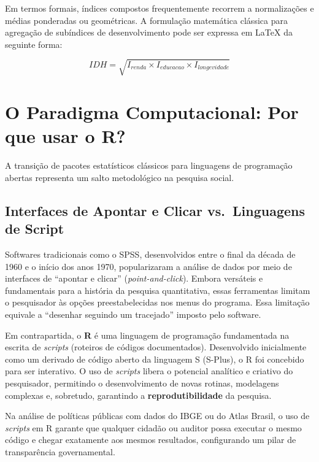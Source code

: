 \documentclass[
  brazilian,
  11pt,
  a4paper,
  open = right,
  twoside = true]{scrbook}
\begin{document}
Em termos formais, índices compostos frequentemente recorrem a
normalizações e médias ponderadas ou geométricas. A formulação
matemática clássica para agregação de subíndices de desenvolvimento pode
ser expressa em LaTeX da seguinte forma:

\[ 
IDH = \sqrt{I_{renda} \times I_{educacao} \times I_{longevidade}} 
\]

\chapter{O Paradigma Computacional: Por que usar o
R?}\label{o-paradigma-computacional-por-que-usar-o-r}

A transição de pacotes estatísticos clássicos para linguagens de
programação abertas representa um salto metodológico na pesquisa social.

\section{Interfaces de Apontar e Clicar vs.~Linguagens de
Script}\label{interfaces-de-apontar-e-clicar-vs.-linguagens-de-script}

Softwares tradicionais como o SPSS, desenvolvidos entre o final da
década de 1960 e o início dos anos 1970, popularizaram a análise de
dados por meio de interfaces de ``apontar e clicar''
(\emph{point-and-click}). Embora versáteis e fundamentais para a
história da pesquisa quantitativa, essas ferramentas limitam o
pesquisador às opções preestabelecidas nos menus do programa. Essa
limitação equivale a ``desenhar seguindo um tracejado'' imposto pelo
software.

Em contrapartida, o \textbf{R} é uma linguagem de programação
fundamentada na escrita de \emph{scripts} (roteiros de códigos
documentados). Desenvolvido inicialmente como um derivado de código
aberto da linguagem S (S-Plus), o R foi concebido para ser interativo. O
uso de \emph{scripts} libera o potencial analítico e criativo do
pesquisador, permitindo o desenvolvimento de novas rotinas, modelagens
complexas e, sobretudo, garantindo a \textbf{reprodutibilidade} da
pesquisa.

\begin{tcolorbox}[enhanced jigsaw, arc=.35mm, bottomrule=.15mm, bottomtitle=1mm, breakable, colback=white, colbacktitle=quarto-callout-important-color!10!white, colframe=quarto-callout-important-color-frame, coltitle=black, left=2mm, leftrule=.75mm, opacityback=0, opacitybacktitle=0.6, rightrule=.15mm, title=\textcolor{quarto-callout-important-color}{\faExclamation}\hspace{0.5em}{Reprodutibilidade como Princípio Ético}, titlerule=0mm, toprule=.15mm, toptitle=1mm]

Na análise de políticas públicas com dados do IBGE ou do Atlas Brasil, o
uso de \emph{scripts} em R garante que qualquer cidadão ou auditor possa
executar o mesmo código e chegar exatamente aos mesmos resultados,
configurando um pilar de transparência governamental.

\end{tcolorbox}
\end{document}
